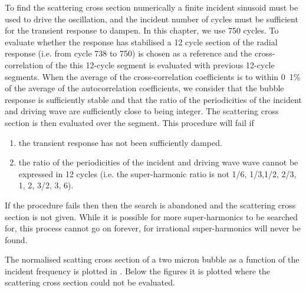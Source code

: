 To find the scattering cross section  numerically 
a finite incident sinusoid must be used to drive the oscillation,
and the incident number of cycles must be sufficient for the transient response to dampen.
In this chapter, we use 750 cycles.
To evaluate whether the response has stabilised
 a 12 cycle section of the radial response  (i.e. from cycle 738 to 750) is chosen as a reference 
and the cross-correlation of the this 12-cycle segment is evaluated with previous 12-cycle segments.
When the average of the cross-correlation coefficients is to within \unit{0.1}\% of the average of the autocorrelation coefficients,
we consider that the bubble response is sufficiently stable
and that the ratio of the periodicities of the incident and driving wave are sufficiently close to being integer.
The scattering cross section is then evaluated over the segment.
This procedure will fail if 
\begin{enumerate}
\item the transient response has not been sufficiently damped.
\item the ratio of the periodicities of the incident and driving wave wave cannot be expressed in 12 cycles
(i.e. the super-harmonic ratio is not  1/6, 1/3,1/2, 2/3, 1, 2, 3/2, 3, 6).
\end{enumerate}
If the procedure fails then then the search is abandoned and the scattering cross section is not given.
While it is possible for more super-harmonics to be searched for,
this process cannot go on forever, for irrational super-harmonics will never be found.

The normalised scatting cross section of a two micron bubble
as a function of the incident frequency is plotted in  .
Below the figures it is 
plotted  where the scattering cross section could not be evaluated.


